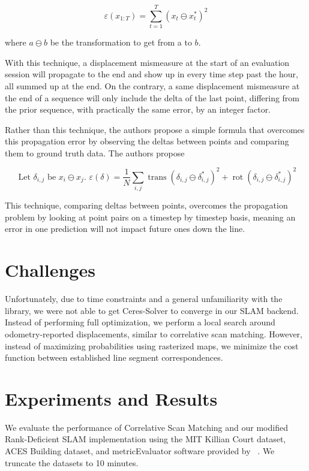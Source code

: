 \documentclass[11pt]{article}
\begin{document}
$$\varepsilon\left(x_{1: T}\right)=\sum_{t=1}^{T}\left(x_{t} \ominus x_{t}^{*}\right)^{2}$$

\begin{center}
    where $a \ominus b$ be the transformation to get from a to $b$. 
\end{center} 

With this technique, a displacement mismeasure at the start of an evaluation session will propagate to the end and show up in every time step past the hour, all summed up at the end. On the contrary, a same displacement mismeasure at the end of a sequence will only include the delta of the last point, differing from the prior sequence, with practically the same error, by an integer factor.  

Rather than this technique, the authors propose a simple formula that overcomes this propagation error by observing the deltas between points and comparing them to ground truth data. The authors propose 

$$\text { Let } \delta_{i, j} \text { be } x_{i} \ominus x_{j}\text{. } \varepsilon(\delta)=\frac{1}{N} \sum_{i, j} \operatorname{trans}\left(\delta_{i, j} \ominus \delta_{i, j}^{*}\right)^{2}+\operatorname{rot}\left(\delta_{i, j} \ominus \delta_{i, j}^{*}\right)^{2}$$

This technique, comparing deltas between points, overcomes the propagation problem by looking at point pairs on a timestep by timestep basis, meaning an error in one prediction will not impact future ones down the line.

\section{Challenges}

Unfortunately, due to time constraints and a general unfamiliarity with the library, we were not able to get Ceres-Solver to converge in our SLAM backend. Instead of performing full optimization, we perform a local search around odometry-reported displacements, similar to correlative scan matching. However, instead of maximizing probabilities using rasterized maps, we minimize the cost function between established line segment correspondences.

\section{Experiments and Results}

We evaluate the performance of Correlative Scan Matching and our modified Rank-Deficient SLAM implementation using the MIT Killian Court dataset, ACES Building dataset, and metricEvaluator software provided by ~\cite{Kmmerle2009OnMT}. We truncate the datasets to 10 minutes.
\end{document}
